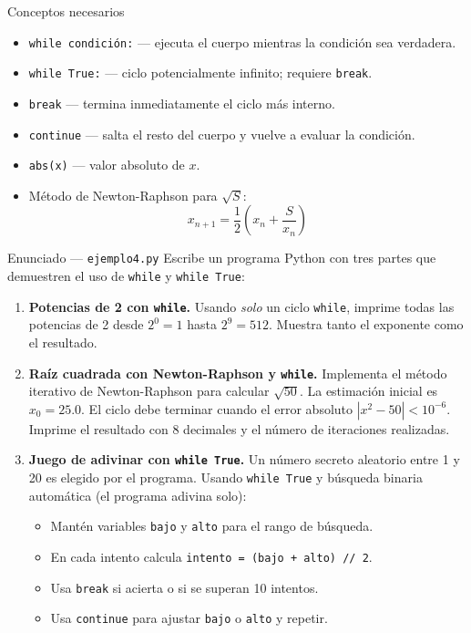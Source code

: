 \documentclass[12pt,a4paper]{article}
\begin{document}
\vspace{0.6em}
\begin{conceptobox}{Conceptos necesarios}
\begin{itemize}
  \item \texttt{while condición:} — ejecuta el cuerpo mientras la condición sea verdadera.
  \item \texttt{while True:} — ciclo potencialmente infinito; requiere \texttt{break}.
  \item \texttt{break} — termina inmediatamente el ciclo más interno.
  \item \texttt{continue} — salta el resto del cuerpo y vuelve a evaluar la condición.
  \item \texttt{abs(x)} — valor absoluto de $x$.
  \item Método de Newton-Raphson para $\sqrt{S}$:
        \[x_{n+1} = \frac{1}{2}\!\left(x_n + \frac{S}{x_n}\right)\]
\end{itemize}
\end{conceptobox}

\vspace{0.8em}
\begin{enunciadobox}{Enunciado — \texttt{ejemplo4.py}}
Escribe un programa Python con tres partes que demuestren el uso de \texttt{while}
y \texttt{while True}:

\begin{enumerate}
  \item \textbf{Potencias de 2 con \texttt{while}.}
        Usando \emph{solo} un ciclo \texttt{while}, imprime todas las potencias de 2
        desde $2^0 = 1$ hasta $2^9 = 512$.  Muestra tanto el exponente como el resultado.

  \item \textbf{Raíz cuadrada con Newton-Raphson y \texttt{while}.}
        Implementa el método iterativo de Newton-Raphson para calcular $\sqrt{50}$.
        La estimación inicial es $x_0 = 25.0$.
        El ciclo debe terminar cuando el error absoluto $|x^2 - 50| < 10^{-6}$.
        Imprime el resultado con 8 decimales y el número de iteraciones realizadas.

  \item \textbf{Juego de adivinar con \texttt{while True}.}
        Un número secreto aleatorio entre 1 y 20 es elegido por el programa.
        Usando \texttt{while True} y búsqueda binaria automática (el programa adivina solo):
        \begin{itemize}
          \item Mantén variables \texttt{bajo} y \texttt{alto} para el rango de búsqueda.
          \item En cada intento calcula \texttt{intento = (bajo + alto) // 2}.
          \item Usa \texttt{break} si acierta o si se superan 10 intentos.
          \item Usa \texttt{continue} para ajustar \texttt{bajo} o \texttt{alto} y repetir.
        \end{itemize}
\end{enumerate}
\end{enunciadobox}
\end{document}
